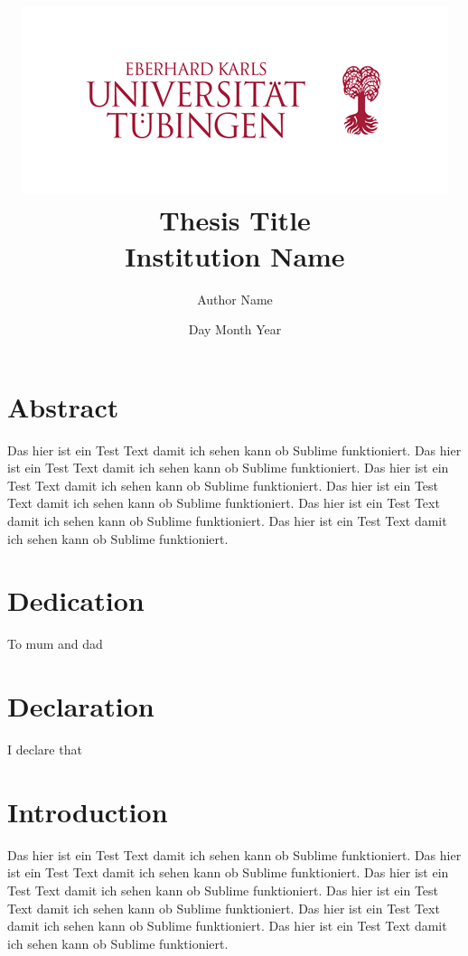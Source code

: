\documentclass[12pt]{report}
\title{
	{\includegraphics{university.png}}
	{Thesis Title}\\
	{\large Institution Name}\\
}
\author{Author Name}
\date{Day Month Year}
\begin{document}
\maketitle

\chapter*{Abstract}
Das hier ist ein Test Text damit ich sehen kann ob Sublime funktioniert. Das hier ist ein Test Text damit ich sehen kann ob Sublime funktioniert. Das hier ist ein Test Text damit ich sehen kann ob Sublime funktioniert. Das hier ist ein Test Text damit ich sehen kann ob Sublime funktioniert. Das hier ist ein Test Text damit ich sehen kann ob Sublime funktioniert. Das hier ist ein Test Text damit ich sehen kann ob Sublime funktioniert.

\chapter*{Dedication}
To mum and dad

\chapter*{Declaration}
I declare that

\chapter*{Introduction}
Das hier ist ein Test Text damit ich sehen kann ob Sublime funktioniert. Das hier ist ein Test Text damit ich sehen kann ob Sublime funktioniert. Das hier ist ein Test Text damit ich sehen kann ob Sublime funktioniert. Das hier ist ein Test Text damit ich sehen kann ob Sublime funktioniert. Das hier ist ein Test Text damit ich sehen kann ob Sublime funktioniert. Das hier ist ein Test Text damit ich sehen kann ob Sublime funktioniert.
\end{document}
